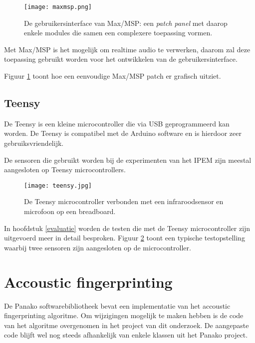 \begin{figure}[!h]
	\captionsetup{width=0.8\textwidth}
	\caption[Gebruikersinterface van Max/MSP]{De gebruikersinterface van Max/MSP: een \textit{patch panel} met daarop enkele modules die samen een complexere toepassing vormen.}
	\centering
	\advance\parskip0.3cm
	\texttt{[image: maxmsp.png]}
	\label{screenshot-max}
\end{figure}

Met Max/MSP is het mogelijk om realtime audio te  verwerken, daarom zal deze toepassing gebruikt worden voor het ontwikkelen van de gebruikersinterface. 

Figuur \ref{screenshot-max} toont hoe een eenvoudige Max/MSP patch er grafisch uitziet.

\subsection{Teensy}

De Teensy is een kleine microcontroller die via USB geprogrammeerd kan worden. De Teensy is compatibel met de Arduino software en is hierdoor zeer gebruiksvriendelijk. \cite{teensy2016}

De sensoren die gebruikt worden bij de experimenten van het IPEM zijn meestal aangesloten op Teensy microcontrollers.

\begin{figure}[!h]
	\captionsetup{width=0.7\textwidth}
	\caption[Teensy microcontroller]{De Teensy microcontroller verbonden met een infraroodsensor en microfoon op een breadboard.}
	\centering
	\advance\parskip0.3cm
	\texttt{[image: teensy.jpg]}
	\label{teensy-pic}
\end{figure}

In hoofdstuk \ref{evaluatie} worden de testen die met de Teensy microcontroller zijn uitgevoerd meer in detail besproken. Figuur \ref{teensy-pic} toont een typische testopstelling waarbij twee sensoren zijn aangesloten op de microcontroller.

\section{Accoustic fingerprinting}

De Panako softwarebibliotheek bevat een implementatie van het accoustic fingerprinting algoritme. Om wijzigingen mogelijk te maken hebben is de code van het algoritme overgenomen in het project van dit onderzoek. De aangepaste code blijft wel nog steeds afhankelijk van enkele klassen uit het Panako project. 

